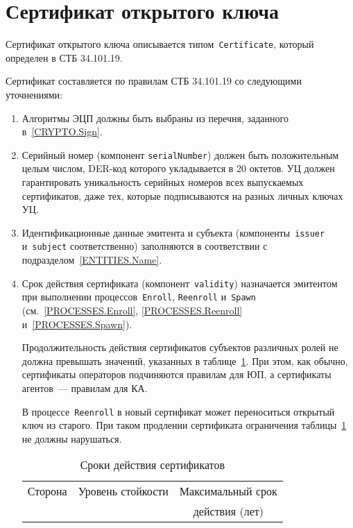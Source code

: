 \section{Сертификат открытого ключа}\label{FMT.Cert}

Сертификат открытого ключа описывается типом~\texttt{Certificate}, который 
определен в СТБ 34.101.19.

Сертификат составляется по правилам СТБ 34.101.19 со следующими уточнениями:
\begin{enumerate}

\item
Алгоритмы ЭЦП должны быть выбраны из перечня, заданного 
в~\ref{CRYPTO.Sign}.

\item
Серийный номер (компонент \texttt{serialNumber}) должен быть 
положительным целым числом, 
DER-код которого укладывается в 20 октетов.
%
УЦ должен гарантировать уникальность серийных 
номеров всех выпускаемых сертификатов, даже тех, которые 
подписываются на разных личных ключах УЦ.

\item
Идентификационные данные эмитента и субъекта (компоненты~\texttt{issuer} 
и~\texttt{subject} соответственно) заполняются в соответствии с 
подразделом~\ref{ENTITIES.Name}. 

\item
Срок действия сертификата (компонент~\texttt{validity}) назначается 
эмитентом при выполнении 
процессов~\texttt{Enroll}, \texttt{Reenroll} и~\texttt{Spawn} 
(см.~\ref{PROCESSES.Enroll}, \ref{PROCESSES.Reenroll} 
и~\ref{PROCESSES.Spawn}).

Продолжительность действия сертификатов субъектов различных ролей
не должна превышать значений, указанных в таблице~\ref{Table.CERT.Validity}. 
%
При этом, как обычно, сертификаты операторов подчиняются правилам для ЮП, 
а сертификаты агентов~--- правилам для КА.

В процессе~\texttt{Reenroll} в новый сертификат может переноситься открытый 
ключ из старого. При таком продлении сертификата ограничения
таблицы~\ref{Table.CERT.Validity} не должны нарушаться.

\begin{table}
\caption{Сроки действия сертификатов}
\label{Table.CERT.Validity}
\begin{tabular}{|l|c|c|}
\hline
Сторона & Уровень стойкости & Максимальный срок\\
        &                   & действия (лет)\\
\hline
\hline


\end{tabular}
\end{table}
\end{enumerate}
